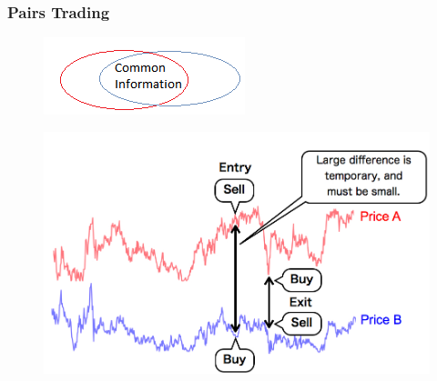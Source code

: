 \documentclass[pdf,10pt,xcolor=dvipsnames,hide notes]{beamer}
\begin{document}
\begin{frame}
\frametitle{Pairs Trading}

\begin{figure}[htbp]
	\centering
	\includegraphics[scale=0.5]{fig1.png}
	\label{fig:fig1}
\end{figure}

\begin{figure}[htbp]
	\centering
	\includegraphics[scale=0.38]{fig2.png}
	\label{fig:fig2}
\end{figure}

\end{frame}

	
\section{}
	
\end{document}
